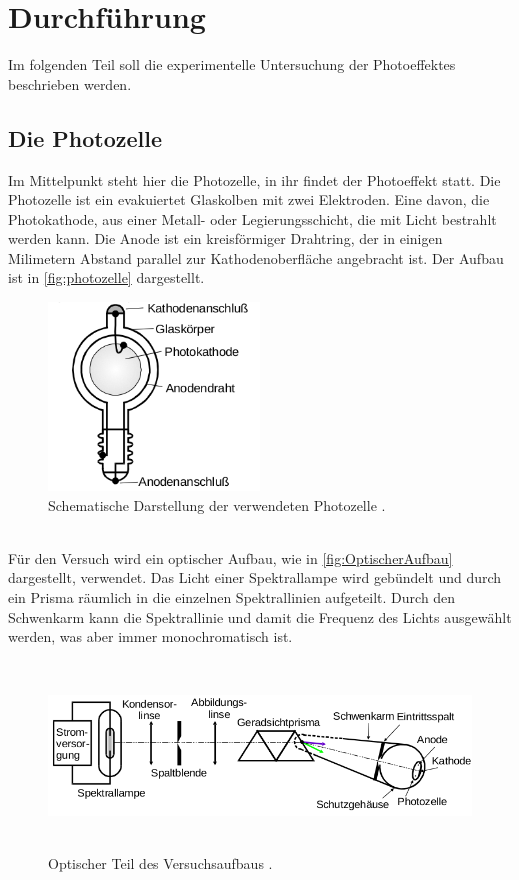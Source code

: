 \section{Durchführung}
\label{sec:Durchführung}

Im folgenden Teil soll die experimentelle Untersuchung der Photoeffektes beschrieben
werden.

\subsection{Die Photozelle}
\label{sec:Die Photozelle}
Im Mittelpunkt steht hier die Photozelle, in ihr findet der Photoeffekt statt. Die
Photozelle ist ein evakuiertet Glaskolben mit zwei Elektroden. Eine davon, die
Photokathode, aus einer Metall- oder Legierungsschicht, die mit Licht bestrahlt werden
kann. Die Anode ist ein kreisförmiger Drahtring, der in einigen Milimetern Abstand
parallel zur Kathodenoberfläche angebracht ist. Der Aufbau ist in \autoref{fig:photozelle}
dargestellt.
\begin{figure}
	\centering
	\includegraphics[height=5cm]{pictures/photozelle.png}
	\caption{Schematische Darstellung der verwendeten Photozelle \cite{anleitung}.}
	\label{fig:photozelle}
\end{figure}
\\
Für den Versuch wird ein optischer Aufbau, wie in \autoref{fig:OptischerAufbau}
dargestellt, verwendet. Das Licht einer Spektrallampe wird gebündelt und durch ein Prisma
räumlich in die einzelnen Spektrallinien aufgeteilt. Durch den Schwenkarm kann die
Spektrallinie und damit die Frequenz des Lichts ausgewählt werden, was aber immer
monochromatisch ist.
\begin{figure}
	\centering
	\includegraphics[height=5cm]{pictures/OptischerAufbau.png}
	\caption{Optischer Teil des Versuchsaufbaus \cite{anleitung}.}
	\label{fig:OptischerAufbau}
\end{figure}

